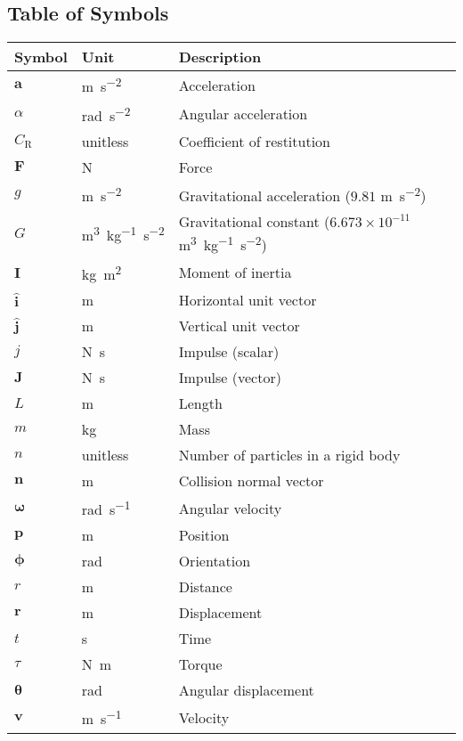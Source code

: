 \documentclass[12pt, titlepage]{article}
\begin{document}
\subsection{Table of Symbols} \label{TblOfSym}
\begin{tabularx}{\textwidth}{p{3cm}p{2cm}X}
	\toprule 
	\textbf{Symbol} & \textbf{Unit} & \textbf{Description} \\
	\midrule
	$\mathbf{a}$ & \si{\metre\per\second\tothe{2}} & Acceleration \\
	$\alpha$ & \si{\radian\per\second\tothe{2}} & Angular acceleration \\
	$C_\text{R}$ & unitless & Coefficient of restitution \\
	$\mathbf{F}$ & \si{\newton} & Force \\
	 $g$ & \si{\metre\per\second\tothe{2}} & Gravitational acceleration ($9.81$ \si{\metre\per\second\tothe{2}}) \\
	$G$ & \si{\metre\tothe{3}\per\kilogram\second\tothe{-2}} & Gravitational constant ($6.673 \times 10^{-11}$ \si{\metre\tothe{3}\per\kilogram\second\tothe{-2}}) \\
	$\mathbf{I}$ & \si{\kilogram\metre\tothe{2}} & Moment of inertia \\
	$\mathbf{\hat{i}}$ & \si{\metre} & Horizontal unit vector \\
	$\mathbf{\hat{j}}$ & \si{\metre} & Vertical unit vector \\
	$j$ & \si{\newton\second} & Impulse (scalar) \\
	$\mathbf{J}$ & \si{\newton\second} & Impulse (vector) \\
	$L$ & \si{\metre} & Length \\
	$m$ & \si{\kilogram} & Mass \\
	$n$ & unitless & Number of particles in a rigid body \\
	$\mathbf{n}$ & \si{\metre} & Collision normal vector \\
	$\boldsymbol{\omega}$ & \si{\radian\per\second} & Angular velocity \\
	$\mathbf{p}$ & \si{\metre} & Position \\
	$\boldsymbol{\phi}$ & \si{\radian} & Orientation \\
	$r$ & \si{\metre} & Distance \\
	$\mathbf{r}$ & \si{\metre} & Displacement \\
	$t$ & \si{\second} & Time \\
	$\tau$ & \si{\newton\metre} & Torque \\
	$\boldsymbol{\theta}$ & \si{\radian} & Angular displacement \\
	$\mathbf{v}$ & \si{\metre\per\second} & Velocity \\
	
	\bottomrule
\end{tabularx}
\end{document}
